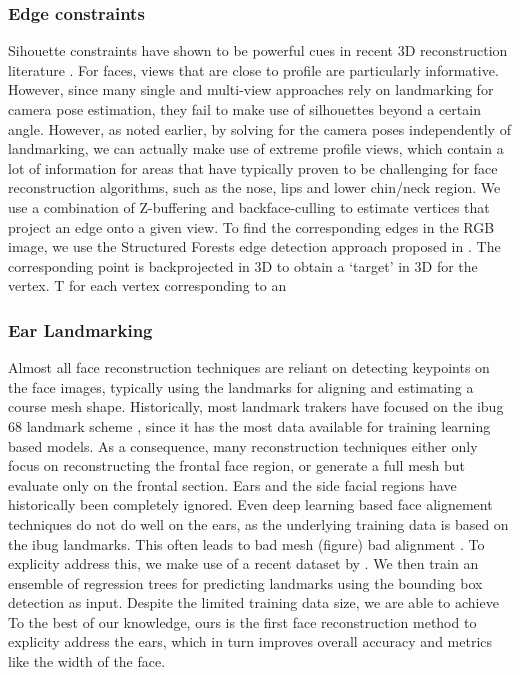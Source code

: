 \documentclass[10pt,twocolumn,letterpaper]{article}
\begin{document}
\subsubsection{Edge constraints}
Sihouette constraints have shown to be powerful cues in recent 3D reconstruction literature \cite{alldieck2018detailed,bas2016fitting}. For faces, views that are close to profile are particularly informative. However, since many single and multi-view approaches rely on landmarking for camera pose estimation, they fail to make use of silhouettes beyond a certain angle.
However, as noted earlier, by solving for the camera poses independently of landmarking, we can actually make use of extreme profile views, which contain a lot of information for  areas that have typically proven to be challenging for face reconstruction algorithms, such as the nose, lips and lower chin/neck region.
We use a combination of Z-buffering \cite{Foley1990ComputerG} and backface-culling  to estimate vertices that project an edge onto a given view. To find the corresponding edges in the RGB image, we use the Structured Forests edge detection approach proposed in \cite{dollar2013structured}. The corresponding point is backprojected in 3D to obtain a `target' in 3D for the vertex.
T for each vertex corresponding to an 

\subsubsection{Ear Landmarking}

Almost all face reconstruction techniques are reliant on detecting keypoints on the face images, typically using the landmarks for aligning and estimating a course mesh shape.
Historically, most landmark trakers have focused on the ibug 68 landmark scheme \cite{}, since it has the most data available for training learning based models. As a consequence, many reconstruction techniques either only focus on reconstructing the frontal face region, or generate a full mesh but evaluate only on the frontal section. Ears and the side facial regions have historically been completely ignored. Even deep learning based face alignement techniques do not do well on the ears, as the underlying training data is based on the ibug landmarks. This often leads to bad mesh (figure) bad alignment . 
To explicity address this, we make use of a recent dataset by . We then train an ensemble of regression trees \cite{} for predicting landmarks using the bounding box detection as input. Despite the limited training data size, we are able to achieve
To the best of our knowledge, ours is the first face reconstruction method to explicity address the ears, which in turn improves overall accuracy and metrics like the width of the face.
\end{document}
